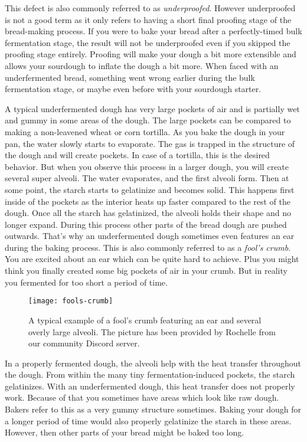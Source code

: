This defect is also commonly referred to as \emph{underproofed}. However underproofed
is not a good term as it only refers to having a short final
proofing stage of the bread-making process.
If you were to bake your bread after a perfectly-timed bulk fermentation stage,
the result will not be underproofed even if you skipped the proofing stage entirely.
Proofing will make your dough a bit more extensible and allows your sourdough
to inflate the dough a bit more. When faced with an underfermented bread, something
went wrong earlier during the bulk fermentation stage, or maybe even
before with your sourdough starter.

A typical underfermented dough has very large pockets of air and is partially
wet and gummy in some areas of the dough. The large pockets can be compared
to making a non-leavened wheat or corn tortilla. As you bake the dough in your pan,
the water slowly starts to evaporate. The gas is trapped in the structure of the dough
and will create pockets. In case of a tortilla, this is the desired behavior.
But when you observe this process in a larger dough, you will create several
super alveoli. The water evaporates, and the first alveoli form. Then at some point,
the starch starts to gelatinize and becomes solid. This happens first inside of the pockets
as the interior heats up faster compared to the rest of the dough. Once all the starch
has gelatinized, the alveoli holds their shape and no longer expand. During this
process other parts of the bread dough are pushed outwards. That's why an underfermented
dough sometimes even features an ear during the baking process. This
is also commonly referred to as a \emph{fool's crumb}. You are excited about an ear which
can be quite hard to achieve. Plus you might think you finally created some big pockets
of air in your crumb. But in reality you fermented for too short a period
of time.

\begin{figure}
  \texttt{[image: fools-crumb]}
  \caption[Fool's crumb large alveoli]{A typical example of a fool's crumb
      featuring an ear and several overly large alveoli. The picture has been
      provided by Rochelle from our community Discord server.}%
  \label{fools-crumb}
\end{figure}

In a properly fermented dough, the alveoli help with the heat transfer throughout the dough.
From within the many tiny fermentation-induced pockets, the starch gelatinizes. With
an underfermented dough, this heat transfer does not properly work. Because of that
you sometimes have areas which look like raw dough. Bakers refer to this as a very
gummy structure sometimes. Baking your dough for a longer period of time would also properly
gelatinize the starch in these areas. However, then other parts of your bread
might be baked too long.

